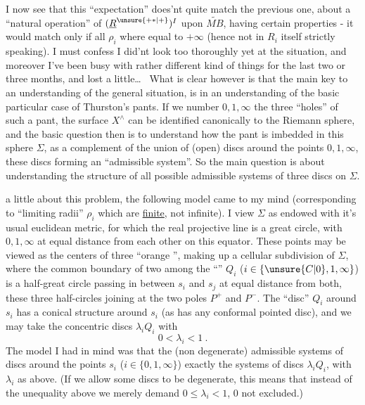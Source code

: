 I now see that this ``expectation'' does'nt quite match the previous one, about a ``natural operation'' of $(\underline R^{\unsure{+*|+}})^I$ upon $\widetilde{MB}$, having certain properties - it would match only if all $\rho_i$ where equal to $+\infty$ (hence not in $R_i$ itself strictly speaking). I must confess I did'nt look too thoroughly yet at the situation, and moreover I've been busy with rather different kind of things for the last two or three months, and lost a little\ldots\  What is clear however is that the main key to an understanding of the general situation, is in an understanding of the basic particular case of Thurston's pants. If we number $0,1,\infty$ the three ``holes'' of such a pant, the surface $X^{\wedge}$ can be identified canonically to the Riemann sphere, and the basic question then is to understand how the pant is imbedded in this sphere $\Sigma$, as a complement of  the union of (open) discs around the points $0,1,\infty$, these discs forming an ``admissible system''. So the main question is about understanding the structure of all possible admissible systems of three discs on $\Sigma$.

 a little about this problem, the following model came to my mind (corresponding to ``limiting radii'' $\rho_i$ which are \uline{finite}, not infinite). I view $\Sigma$ as endowed with it's usual euclidean metric, for which the real projective line is a great circle, with $0,1,\infty$ at equal distance from each other on this equator. These points may be viewed as the centers of three ``orange '', making up a cellular subdivision of $\Sigma$, where the common boundary of two among the ``'' $Q_i$ ($i\in\{\unsure{C|0},1,\infty\}$) is a half-great circle passing in between $s_i$ and $s_j$ at equal
distance from both, these three half-circles joining at the two poles $P^+$ and $P^-$. The ``disc'' $Q_i$ around $s_i$ has a conical structure around $s_i$ (as has any conformal pointed disc), and we may take the concentric  discs $\lambda_iQ_i$ with
\[
0<\lambda_i<1\ .
\]
The model I had in mind was that the (non degenerate) admissible systems of discs around the points $s_i$ ($i\in\{0,1,\infty\}$)  exactly the systems of discs $\lambda_iQ_i$, with $\lambda_i$ as above. (If we allow some discs to be degenerate, this means that instead of the unequality above we merely demand $0\le\lambda_i<1$, $0$ not excluded.)

